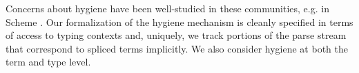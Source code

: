 \documentclass{sig-alternate}[10pt]
\begin{document}
Concerns about hygiene have been well-studied in these communities, e.g. in Scheme \cite{Dybvig:1992:SAS:173617.173620}. 
Our formalization of the hygiene mechanism is cleanly specified in terms of access to typing contexts and, uniquely, we track portions of the parse stream that correspond to spliced terms implicitly. We also consider hygiene at both the term and type level.






\end{document}
